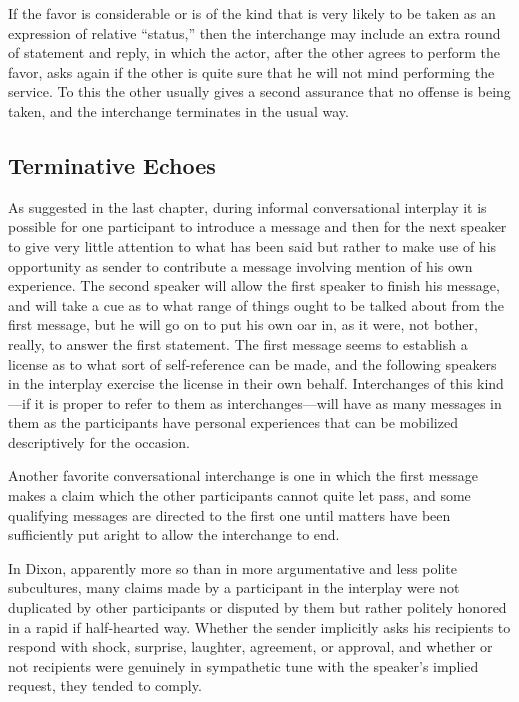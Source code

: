 \documentclass[openany,nobib]{tufte-book}
\begin{document}
If the favor is considerable or is of the kind that is very likely to be
taken as an expression of relative ``status,'' then the interchange may
include an extra round of statement and reply, in which the actor, after
the other agrees to perform the favor, asks again if the other is quite
sure that he will not mind performing the service. To this the other
usually gives a second assurance that no offense is being taken, and the
interchange terminates in the usual way.

\hypertarget{terminative-echoes}{%
\subsection{Terminative Echoes}\label{terminative-echoes}}

As suggested in the last chapter, during informal conversational
interplay it is possible for one participant to introduce a message and
then for the next speaker to give very little attention to what has been
said but rather to make use of his opportunity as sender to contribute a
message involving mention of his own experience. The second speaker will
allow the first speaker to finish his message, and will take a cue as to
what range of things ought to be talked about from the first message,
but he will go on to put his own oar in, as it were, not bother, really,
to answer the first statement. The first message seems to establish a
license as to what sort of self-reference can be made, and the following
speakers in the interplay exercise the license in their own behalf.
Interchanges of this kind---if it is proper to refer to them as
interchanges---will have as many messages in them as the participants
have personal experiences that can be mobilized descriptively for the
occasion.

Another favorite conversational interchange is one in which the first
message makes a claim which the other participants cannot quite let
pass, and some qualifying messages are directed to the first one until
matters have been sufficiently put aright to allow the interchange to
end.

In Dixon, apparently more so than in more argumentative and less polite
subcultures, many claims made by a participant in the interplay were not
duplicated by other participants or disputed by them but rather politely
honored in a rapid if half-hearted way. Whether the sender implicitly
asks his recipients to respond with shock, surprise, laughter,
agreement, or approval, and whether or not recipients were genuinely in
sympathetic tune with the speaker's implied request, they tended to
comply.
\end{document}
